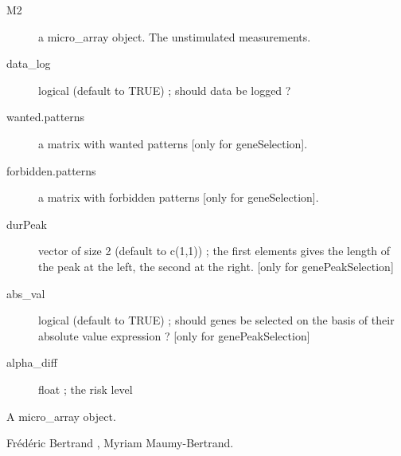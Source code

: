 \documentclass[a4paper]{book}
\begin{document}
\begin{Arguments}
\begin{ldescription}
\begin{description}
\item[M2] a micro\_array object. The unstimulated measurements.
\item[data\_log] logical (default to TRUE) ; should data be logged ?
\item[wanted.patterns] a matrix with wanted patterns [only for geneSelection].
\item[forbidden.patterns] a matrix with forbidden patterns [only for geneSelection].
\item[durPeak] vector of size 2 (default to c(1,1)) ; the first elements gives the length of the peak at the left, the second at the right. [only for genePeakSelection]
\item[abs\_val]  logical (default to TRUE) ; should genes be selected on the basis of their absolute value expression ? [only for genePeakSelection]
\item[alpha\_diff] float ; the risk level 

\end{description}

\end{ldescription}
\end{Arguments}
%
\begin{Value}
A micro\_array object.  
\end{Value}
%
\begin{Author}\relax
Frédéric Bertrand , Myriam Maumy-Bertrand.
\end{Author}
%
\end{document}
